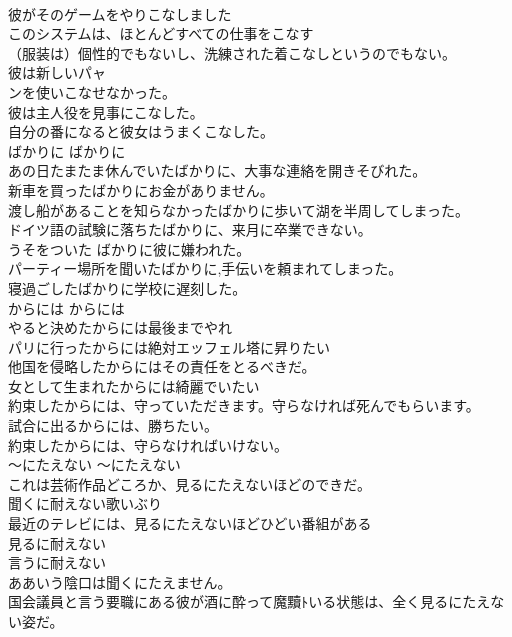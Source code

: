 \documentclass[8pt]{extreport}
\begin{document}
\begin{CJK}{UTF8}{min}
\\	彼がそのゲームをやりこなしました  
\\	このシステムは、ほとんどすべての仕事をこなす   
\\	（服装は）個性的でもないし、洗練された着こなしというのでもない。  
\\	彼は新しいパャ
\\	ンを使いこなせなかった。   
\\	彼は主人役を見事にこなした。   
\\	自分の番になると彼女はうまくこなした。   
\\	ばかりに	ばかりに	
\\	あの日たまたま休んでいたばかりに、大事な連絡を開きそびれた。  
\\	新車を買ったばかりにお金がありません。  
\\	渡し船があることを知らなかったばかりに歩いて湖を半周してしまった。   
\\	ドイツ語の試験に落ちたばかりに、来月に卒業できない。  
\\	うそをついた ばかりに彼に嫌われた。  
\\	パーティー場所を聞いたばかりに,手伝いを頼まれてしまった。  
\\	寝過ごしたばかりに学校に遅刻した。   
\\	からには	からには	
\\	やると決めたからには最後までやれ  
\\	パリに行ったからには絶対エッフェル塔に昇りたい  
\\	他国を侵略したからにはその責任をとるべきだ。  
\\	女として生まれたからには綺麗でいたい  
\\	約束したからには、守っていただきます。守らなければ死んでもらいます。  
\\	試合に出るからには、勝ちたい。  
\\	約束したからには、守らなければいけない。  
\\	〜にたえない	〜にたえない	
\\	これは芸術作品どころか、見るにたえないほどのできだ。  
\\	聞くに耐えない歌いぶり   
\\	最近のテレビには、見るにたえないほどひどい番組がある   
\\	見るに耐えない   
\\	言うに耐えない   
\\	ああいう陰口は聞くにたえません。  
\\	国会議員と言う要職にある彼が酒に酔って魔黷ﾄいる状態は、全く見るにたえない姿だ。   

\end{CJK}
\end{document}
